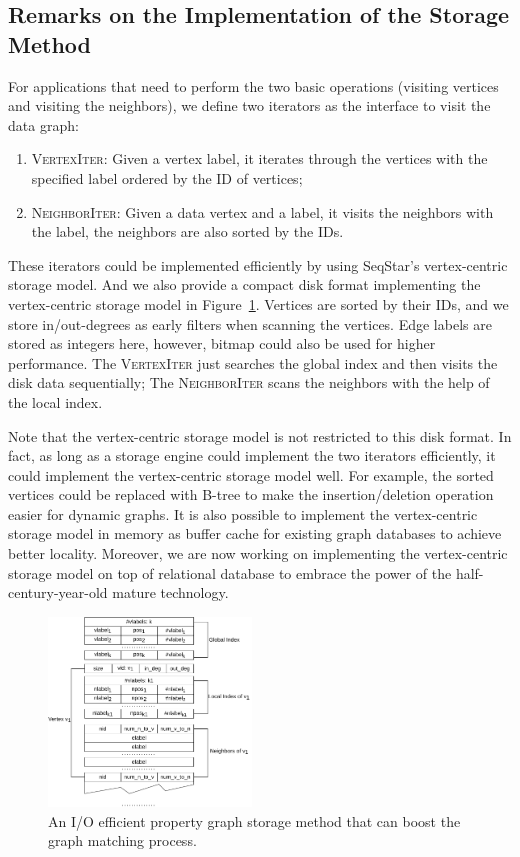 \subsection{Remarks on the Implementation of the Storage Method}\label{sec:storage_iterators}
For applications that need to perform the two basic operations (visiting vertices and visiting the neighbors),
we define two iterators as the interface to visit the data graph:
\begin{enumerate}[noitemsep]
\item \textsc{VertexIter}: Given a vertex label, it iterates through the vertices with the specified label ordered by the ID of vertices;
\item \textsc{NeighborIter}: Given a data vertex and a label, it visits the neighbors with the label, the neighbors are also sorted by the IDs.
\end{enumerate}

These iterators could be implemented efficiently by using SeqStar's vertex-centric storage model.
And we also provide a compact disk format implementing the vertex-centric storage model in Figure~\ref{img:data_graph}.
Vertices are sorted by their IDs, and we store in/out-degrees as early filters when scanning the vertices.
Edge labels are stored as integers here, however, bitmap could also be used for higher performance.
The \textsc{VertexIter} just searches the global index and then visits the disk data sequentially;
The \textsc{NeighborIter} scans the neighbors with the help of the local index.

Note that the vertex-centric storage model is not restricted to this disk format.
In fact, as long as a storage engine could implement the two iterators efficiently,
it could implement the vertex-centric storage model well.
For example, the sorted vertices could be replaced with B-tree to make the insertion/deletion operation easier for dynamic graphs.
It is also possible to implement the vertex-centric storage model in memory as buffer cache for existing graph databases to achieve better locality.
Moreover, we are now working on implementing the vertex-centric storage model on top of relational database to embrace the power of the half-century-year-old mature technology.
\begin{figure}[ht]
  \centering
  \includegraphics[width=0.48\textwidth]{img/data_graph.pdf}
  \caption{An I/O efficient property graph storage method that can boost the graph matching process.}\label{img:data_graph}
\end{figure}
